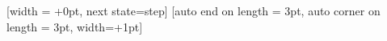 {
  [width = +0pt,
                next state=step]{
    \pgfpathmoveto{\pgfpoint{0pt}{0pt}}
  }
  [auto end on length    = 3pt,
               auto corner on length = 3pt,               
               width=+1pt]
  {
    \pgfpathlineto{\pgfpoint{1pt}{0pt}}
  }
  {}
}
